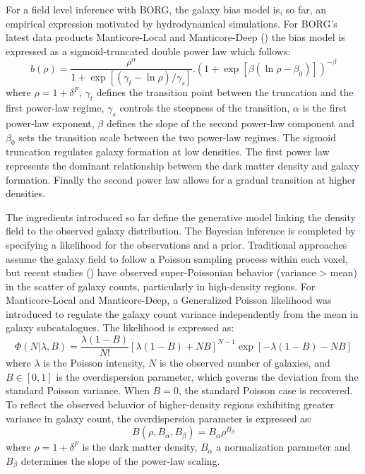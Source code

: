 For a field level inference with BORG, the galaxy bias model is, so far, an empirical expression motivated by hydrodynamical simulations. 
For BORG's latest data products Manticore-Local and Manticore-Deep (\cite{Mcalpine_2025,Mcalpine_2026}) 
the bias model is expressed as a sigmoid-truncated double 
power law which follows:
\begin{equation}
    b(\rho) = \frac{\rho^{\alpha}}{1+\exp \left[ \left( \gamma_t - \ln \rho \right)/\gamma_s \right]}. \left( 1 + \exp \left[ \beta \left( \ln \rho - \beta_0 \right)\right] \right)^{-\beta}
\end{equation}
where $\rho = 1 + \delta^F$, $\gamma_t$ defines the transition point between the truncation and the first power-law regime, $\gamma_s$ controls the steepness of the 
transition, $\alpha$ is the first power-law exponent, $\beta$ defines the slope of the second power-law component and $\beta_0$ sets the transition scale between the two power-law regimes. 
The sigmoid truncation regulates galaxy formation at low densities. The first power law represents the dominant relationship between the dark matter density and galaxy 
formation. Finally the second power law allows for a gradual transition at higher densities. 

The ingredients introduced so far define the generative model linking the density field to the observed galaxy distribution. 
The Bayesian inference is completed by specifying a likelihood for the observations and a prior. 
Traditional approaches assume the galaxy field to follow a Poisson sampling process within each voxel, but recent studies (\cite{Ata_2015, Gruen_2018, Britt_2024}) have observed super-Poissonian behavior (variance > mean) 
in the scatter of galaxy counts, particularly in high-density regions. For Manticore-Local and Manticore-Deep, a Generalized Poisson likelihood was introduced to regulate the 
galaxy count variance independently from the mean in galaxy subcatalogues. The likelihood is expressed as:
\begin{equation}
    \Phi (N|\lambda, B) = \frac{\lambda(1-B)}{N!} \left[ \lambda(1-B) + NB  \right]^{N-1}\exp[-\lambda(1-B) - NB]
\end{equation}
where $\lambda$ is the Poisson intensity, $N$ is the observed number of galaxies, and $B \in [0,1]$ is the overdispersion parameter, 
which governs the deviation from the standard Poisson variance. When $B=0$, the standard Poisson case is recovered. To reflect the observed behavior of higher-density 
regions exhibiting greater variance in galaxy count, the overdispersion parameter is expressed as:
\begin{equation}
    B(\rho, B_{\alpha}, B_{\beta}) = B_{\alpha} \rho ^{B_{\beta}}
\end{equation}
where $\rho = 1+\delta^F$ is the dark matter density, $B_{\alpha}$ a normalization parameter and $B_{\beta}$ determines the slope of the power-law scaling. 

